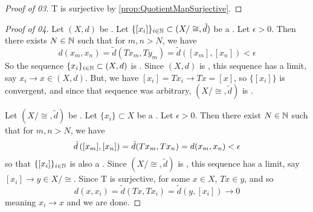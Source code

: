 \begin{prop}
\begin{proof}[Proof of 03]
        T is surjective by \ref{prop:QuotientMapSurjective}.
    \end{proof}
    \begin{proof}[Proof of 04]
        Let $(X,d)$ be \PseudometricComplete. 
        Let $\{[x_i]\}_{i \in \mathbb{N}} \subset (X/\cong, \tilde{d})$ be a \PseudometricCauchySequence. 
        Let $\epsilon > 0$. 
        Then there exists $N \in \mathbb{N}$ such that for $m,n > N$, we have 
        \begin{equation}
            d(x_m, x_n) = \tilde{d}(Tx_m, Ty_m) =\tilde{d}([x_m], [x_n]) < \epsilon
        \end{equation}
        So the sequence $\{x_i\}_{ i \in \mathbb{N}} \subset (X,d)$ is \PseudometricCauchySequence. 
        Since $(X,d)$ is \PseudometricComplete, this sequence has a limit, say $x_i \to x \in (X,d)$. 
        But, we have $[x_i]=Tx_i \to Tx = [x]$, so $\{[x_i]\}$ is convergent, and since that sequence was arbitrary, $(X/\cong, \tilde{d})$ is \PseudometricComplete. 
        
        Let $(X/\cong, \tilde{d})$ be \PseudometricComplete. 
        Let $\{x_i\} \subset X$ be a \PseudometricCauchySequence.
        Let $\epsilon > 0$. Then there exist $N \in \mathbb{N}$ such that for $m,n > N$, we have
        \begin{equation}
            \tilde{d}\left( [x_m], [x_n]\right) = \tilde{d}(Tx_m, Tx_n) = d(x_m, x_n) < \epsilon
        \end{equation}
        so that $\{[x_i]\}_{i \in \mathbb{N}}$ is also a \PseudometricCauchySequence. 
        Since $(X/\cong, \tilde{d})$ is \PseudometricComplete, this sequence has a limit, say $[x_i] \to y \in X/\cong$. 
        Since T is surjective, for some $x \in X$, $Tx \in y$, and so
        \begin{equation}
            d(x, x_i) = \tilde{d}(Tx, Tx_i) =\tilde{d}(y, [x_i]) \to 0
        \end{equation}
        meaning $x_i \to x$ and we are done. 
                
\end{proof}
\end{prop}